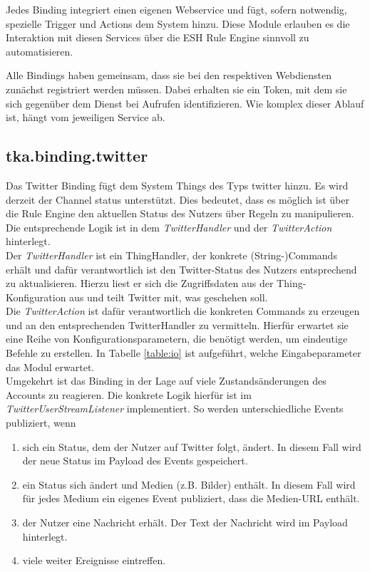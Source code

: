 Jedes Binding integriert einen eigenen Webservice und fügt, sofern notwendig, spezielle Trigger und Actions dem System hinzu. Diese Module erlauben es die Interaktion mit diesen Services über die ESH Rule Engine sinnvoll zu automatisieren.

Alle Bindings haben gemeinsam, dass sie bei den respektiven Webdiensten zunächst registriert werden müssen. Dabei erhalten sie ein Token, mit dem sie sich gegenüber dem Dienst bei Aufrufen identifizieren. Wie komplex dieser Ablauf ist, hängt vom jeweiligen Service ab.

\subsection{tka.binding.twitter}
Das Twitter Binding fügt dem System Things des Typs \glqq twitter\grqq{} hinzu. Es wird derzeit der Channel \glqq status\grqq{} unterstützt. Dies bedeutet, dass es möglich ist über die Rule Engine den aktuellen Status des Nutzers über Regeln zu manipulieren. Die entsprechende Logik ist in dem \textit{TwitterHandler} und der \textit{TwitterAction} hinterlegt. \\

Der \textit{TwitterHandler} ist ein ThingHandler, der konkrete (String-)Commands erhält und dafür verantwortlich ist den Twitter-Status des Nutzers entsprechend zu aktualisieren.  Hierzu liest er sich die Zugriffsdaten aus der Thing-Konfiguration aus und teilt Twitter mit, was geschehen soll.\\

Die \textit{TwitterAction} ist dafür verantwortlich die konkreten Commands zu erzeugen und an den entsprechenden TwitterHandler zu vermitteln. Hierfür erwartet sie eine Reihe von Konfigurationsparametern, die benötigt werden, um eindeutige Befehle zu erstellen. In Tabelle \ref{table:io} ist aufgeführt, welche Eingabeparameter das Modul erwartet.\\

Umgekehrt ist das Binding in der Lage auf viele Zustandsänderungen des Accounts zu reagieren. Die konkrete Logik hierfür ist im \textit{TwitterUserStreamListener} implementiert. So werden unterschiedliche Events publiziert, wenn

\begin{enumerate}
\item sich ein Status, dem der Nutzer auf Twitter folgt, ändert. In diesem Fall wird der neue Status im Payload des Events gespeichert.
\item ein Status sich ändert und Medien (z.B. Bilder) enthält. In diesem Fall wird für jedes Medium ein eigenes Event publiziert, dass die Medien-URL enthält.
\item der Nutzer eine Nachricht erhält. Der Text der Nachricht wird im Payload hinterlegt.
\item viele weiter Ereignisse eintreffen.
\end{enumerate}
 
